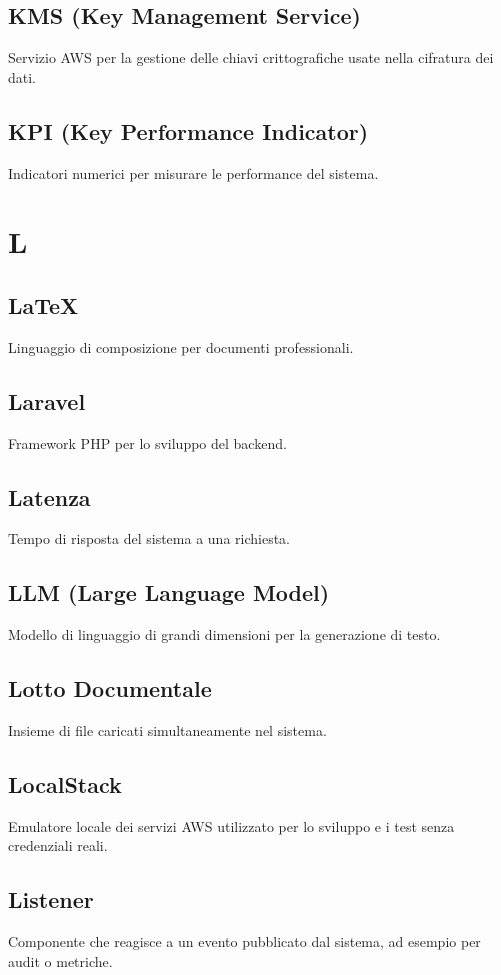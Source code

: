 \documentclass[a4paper,12pt]{article}
\begin{document}
\subsection{KMS (Key Management Service)}
Servizio AWS per la gestione delle chiavi crittografiche usate nella cifratura dei dati.

\subsection{KPI (Key Performance Indicator)}
Indicatori numerici per misurare le performance del sistema.

\section{L}

\subsection{LaTeX}
Linguaggio di composizione per documenti professionali.

\subsection{Laravel}
Framework PHP per lo sviluppo del backend.

\subsection{Latenza}
Tempo di risposta del sistema a una richiesta.


\subsection{LLM (Large Language Model)}
Modello di linguaggio di grandi dimensioni per la generazione di testo.

\subsection{Lotto Documentale}
Insieme di file caricati simultaneamente nel sistema.

\subsection{LocalStack}
Emulatore locale dei servizi AWS utilizzato per lo sviluppo e i test senza credenziali reali.

\subsection{Listener}
Componente che reagisce a un evento pubblicato dal sistema, ad esempio per audit o metriche.
\end{document}

